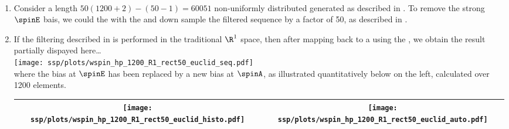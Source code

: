 \begin{example}
\label{ex:spin_rhp}
\mbox{}\\
\begin{enumerate}
  \item \label{item:wspin_hp_seq} \label{item:wspin_hp_rect50}
    Consider a length $50(1200+2)-(50-1)=60051$  non-uniformly distributed  
    generated as described in .
    To remove the strong $\spinE$ bais, we could  the  with 
    the  %
    and down sample the filtered sequence by a factor of 50, as described in .

  \item \label{item:wspin_hp_rect50_R1}
        If the filtering described in  is performed in the traditional $\R^1$ space,
        then after mapping back to a 
        using the ,
        we obtain the result partially dispayed here\ldots
          \\\texttt{[image: ssp/plots/wspin\_hp\_1200\_R1\_rect50\_euclid\_seq.pdf]}\\
        where the bias at $\spinE$ has been replaced by a new bias at $\spinA$, 
        as illustrated quantitatively below on the left, 
        calculated over 1200 elements. %
          \\\begin{tabular}{|>{\scs}c|>{\scs}c|}
               \hline
               \texttt{[image: ssp/plots/wspin\_hp\_1200\_R1\_rect50\_euclid\_histo.pdf]}
              &\texttt{[image: ssp/plots/wspin\_hp\_1200\_R1\_rect50\_euclid\_auto.pdf]}
             \\\hline
          \end{tabular}



\end{enumerate}
\end{example}
